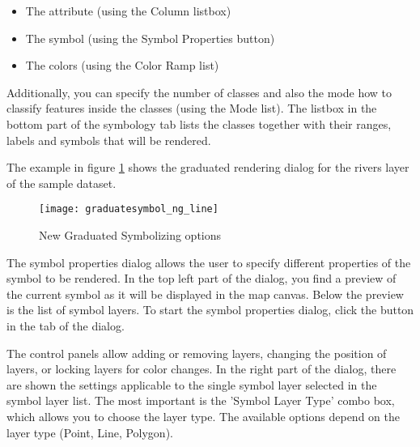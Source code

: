 \begin{itemize}[label=--]
\item The attribute (using the Column listbox)
\item The symbol (using the Symbol Properties button)
\item The colors (using the Color Ramp list)
\end{itemize}

Additionally, you can specify the number of classes and also the mode how to 
classify features inside the classes (using the Mode list). The listbox in the 
bottom part of the symbology tab lists the classes together with their ranges, 
labels and symbols that will be rendered.

The example in figure \ref{fig:gradsymNG} shows the graduated rendering dialog 
for the rivers layer of the \qg sample dataset.

\begin{figure}[ht]
   \centering
   \texttt{[image: graduatesymbol\_ng\_line]}
   \caption{New Graduated Symbolizing options \nixcaption}\label{fig:gradsymNG}
\end{figure}


The symbol properties dialog allows the user to specify different properties of 
the symbol to be rendered. In the top left part of the dialog, you find a preview 
of the current symbol as it will be displayed in the map canvas. Below the preview 
is the list of symbol layers. To start the symbol properties dialog, click the 
 button in the  tab of the
 dialog. 

The control panels allow adding or removing layers, changing the position of layers, 
or locking layers for color changes. In the right part of the dialog, there are 
shown the settings applicable to the single symbol layer selected in the symbol 
layer list. The most important is the 'Symbol Layer Type' combo box, which allows 
you to choose the layer type. The available options depend on the layer type 
(Point, Line, Polygon). 

